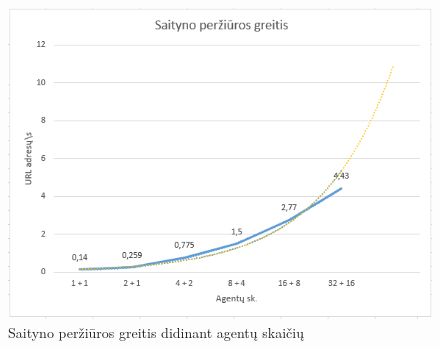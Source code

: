 \begin{figure}[ht]
\hspace{-1cm}
\centering
\includegraphics[scale=1]{img/saityno_peržiūros_greitis.png}
\caption{Saityno peržiūros greitis didinant agentų skaičių}
\label{fig:crawling_speed}
\end{figure}
